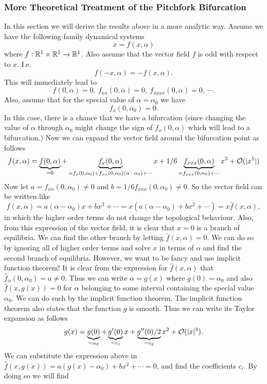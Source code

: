\subsubsection*{More Theoretical Treatment of the Pitchfork Bifurcation}
In this section we will derive the results above in a more analytic way. Assume we have the following family dynamical systems
\[ \dot{x} = f(x,\alpha) \]
where $f:\mathbb{R}^1 \times \mathbb{R}^1 \to \mathbb{R}^1$. Also assume that the vector field $f$ is odd with respect to $x$. I.e.
\[ f(-x,\alpha) = -f(x,\alpha). \]
This will immediately lead to 
\[ f(0,\alpha) = 0,\ f_{xx}(0,\alpha) = 0,\ f_{xxxx}(0,\alpha) = 0,\ \cdots. \]
Also, assume that for the special value of $\alpha = \alpha_0$ we have
\[ f_x(0,\alpha_0) = 0. \]
In this case, there is a chance that we have a bifurcation (since changing the value of $\alpha$ through $\alpha_0$ might change the sign of $f_x(0,\alpha)$ which will lead to a bifurcation.) Now we can expand the vector field around the bifurcation point as follows
\[ f(x,\alpha) = \underbrace{f(0,\alpha)}_{=0} + \underbrace{f_x(0,\alpha)}_{=f_{x}(0,\alpha_0) + f_{x\alpha}(0,\alpha_0)(\alpha - \alpha_0)+\cdots}x + 1/6\underbrace{f_{xxx}(0,\alpha)}_{=f_{xxx}(0,\alpha_0)+\cdots}x^3 + \mathcal{O}(|x^5|) \]
Now let $a = f_{x\alpha}(0,\alpha_0) \neq 0 $ and $b = 1/6 f_{xxx}(0,\alpha_0) \neq 0$. So the vector field can be written like
\[ f(x,\alpha) = a(\alpha-\alpha_0)x + bx^3 + \cdots = x (a(\alpha-\alpha_0)+bx^2 + \cdots)=  x\hat{f}(x,\alpha), \]
in which the higher order terms do not change the topological behaviour. Also, from this expression of the vector field, it is clear that $x=0$ is a branch of equilibria. We can find the other branch by letting $\hat{f}(x,\alpha) = 0$. We can do so by ignoring all of higher order terms and solve $x$ in terms of $\alpha$ and find the second branch of equilibria. However, we want to be fancy and use implicit function theorem! It is clear from the expression for $\hat{f}(x,\alpha)$ that $\hat{f}_\alpha(0,\alpha_0) = a \neq 0$. Thus we can write $\alpha = g(x)$ where $g(0) =\alpha_0$ and also $\hat{f}(x,g(x)) = 0$ for $\alpha$ belonging to some interval containing the special value $\alpha_0$. We can do such by the implicit function theorem. The implicit function theorem also states that the function $g$ is smooth. Thus we can write its Taylor expansion as follows
\[ g(x) =\underbrace{ g(0)}_{=\alpha_0} + \underbrace{g'(0)}_{=c_1}x + \underbrace{g''(0)/2}_{=c_2}x^2+ \mathcal{O}(|x|^3). \]
We can substitute the expression above in $\hat{f}(x,g(x)) = a(g(x)-\alpha_0) + bx^2 + \cdots = 0$, and find the coefficients $c_i$. By doing so we will find
